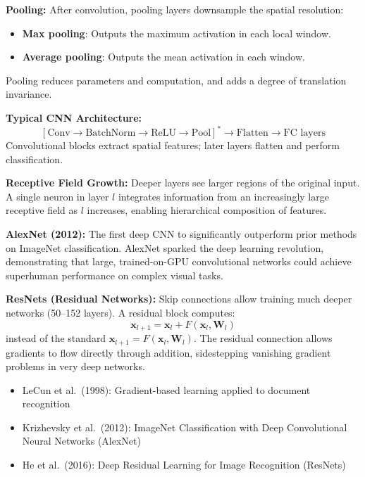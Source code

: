 \textbf{Pooling:} After convolution, pooling layers downsample the spatial resolution:
\begin{itemize}
  \item \textbf{Max pooling}: Outputs the maximum activation in each local window.
  \item \textbf{Average pooling}: Outputs the mean activation in each window.
\end{itemize}
Pooling reduces parameters and computation, and adds a degree of translation invariance.

\textbf{Typical CNN Architecture:}
\[
[\text{Conv} \to \text{BatchNorm} \to \text{ReLU} \to \text{Pool}]^* \to \text{Flatten} \to \text{FC layers}
\]
Convolutional blocks extract spatial features; later layers flatten and perform classification.

\textbf{Receptive Field Growth:} Deeper layers see larger regions of the original input. A single neuron in layer $l$ integrates information from an increasingly large receptive field as $l$ increases, enabling hierarchical composition of features.

\textbf{AlexNet (2012):} The first deep CNN to significantly outperform prior methods on ImageNet classification. AlexNet sparked the deep learning revolution, demonstrating that large, trained-on-GPU convolutional networks could achieve superhuman performance on complex visual tasks.

\textbf{ResNets (Residual Networks):} Skip connections allow training much deeper networks (50--152 layers). A residual block computes:
\[
\mathbf{x}_{l+1} = \mathbf{x}_l + F(\mathbf{x}_l, \mathbf{W}_l)
\]
instead of the standard $\mathbf{x}_{l+1} = F(\mathbf{x}_l, \mathbf{W}_l)$. The residual connection allows gradients to flow directly through addition, sidestepping vanishing gradient problems in very deep networks.

\begin{paperbox}[title={References: CNNs}]
\begin{itemize}
  \item LeCun et al.~(1998): Gradient-based learning applied to document recognition
  \item Krizhevsky et al.~(2012): ImageNet Classification with Deep Convolutional Neural Networks (AlexNet)
  \item He et al.~(2016): Deep Residual Learning for Image Recognition (ResNets)
\end{itemize}
\end{paperbox}


